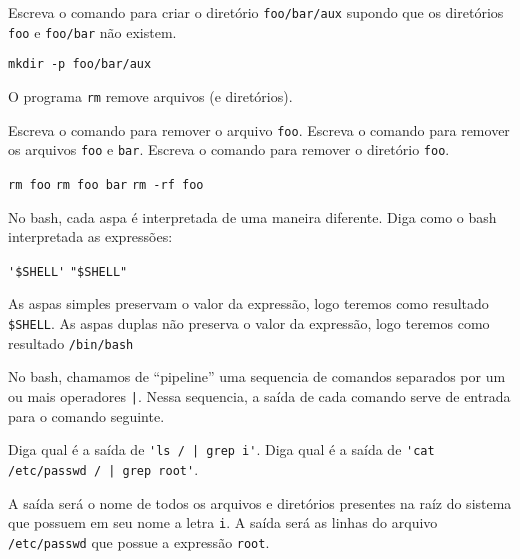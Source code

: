 \begin{Exercise}[label={0021}, difficulty={2}, origin={coreutils}]
  Escreva o comando para criar o diretório \lstinline+foo/bar/aux+ supondo que
  os diretórios \lstinline+foo+ e \lstinline+foo/bar+ não existem.
\end{Exercise}
\begin{Answer}[ref={0021}]
  \lstinline+mkdir -p foo/bar/aux+
\end{Answer}

\begin{Exercise}[label={0022}, difficulty={1}, origin={coreutils}]
  O programa \lstinline+rm+ remove arquivos (e diretórios).

  \Question Escreva o comando para remover o arquivo \lstinline+foo+.
  \Question Escreva o comando para remover os arquivos \lstinline+foo+ e
  \lstinline+bar+.
  \Question Escreva o comando para remover o diretório \lstinline+foo+.
\end{Exercise}
\begin{Answer}[ref={0022}]
  \lstinline+rm foo+
  \lstinline+rm foo bar+
  \lstinline+rm -rf foo+
\end{Answer}

\begin{Exercise}[label={0023}, difficulty={0}, origin={bash}]
  No bash, cada aspa é interpretada de uma maneira diferente. Diga como o bash
  interpretada as expressões:

  \Question \lstinline+'$SHELL'+
  \Question \lstinline+"$SHELL"+
\end{Exercise}
\begin{Answer}[ref={0023}]
  \Question As aspas simples preservam o valor da expressão, logo teremos como
  resultado \lstinline+$SHELL+.
  \Question As aspas duplas não preserva o valor da expressão, logo teremos como
  resultado \lstinline+/bin/bash+
\end{Answer}

\begin{Exercise}[label={0024}, difficulty={0}, origin={bash}]
  No bash, chamamos de ``pipeline'' uma sequencia de comandos separados por um
  ou mais operadores \lstinline+|+. Nessa sequencia, a saída de cada comando
  serve de entrada para o comando seguinte.

  \Question Diga qual é a saída de \lstinline+'ls / | grep i'+.
  \Question Diga qual é a saída de \lstinline+'cat /etc/passwd / | grep root'+.
\end{Exercise}
\begin{Answer}[ref={0023}]
  \Question A saída será o nome de todos os arquivos e diretórios presentes na
  raíz do sistema que possuem em seu nome a letra \lstinline+i+.
  \Question A saída será as linhas do arquivo \lstinline+/etc/passwd+ que possue
  a expressão \lstinline+root+.
\end{Answer}

